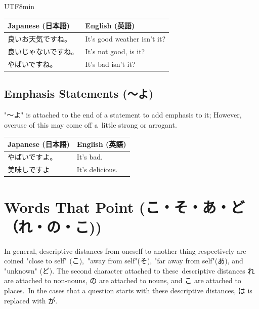 \documentclass[11pt]{article}
\begin{document}
\begin{CJK}{UTF8}{min}
\begin{tabularx}{\textwidth}{X | X}
    \textbf{Japanese (日本語)} & \textbf{English (英語)} \\
    \midrule
    良いお天気ですね。 & It's good weather isn't it? \\
    良いじゃないですね。& It's not good, is it? \\
    やばいですね。 & It's bad isn't it? \\
    \bottomrule
\end{tabularx}

\vspace{25pt}
\subsection{Emphasis Statements (〜よ)}

"〜よ" is attached to the end of a statement to add emphasis to it; However, overuse of this may come off a\
little strong or arrogant.

\begin{tabularx}{\textwidth}{X | X}
    \textbf{Japanese (日本語)} & \textbf{English (英語)} \\
    \midrule
    やばいですよ。 & It's bad. \\
    美味しですよ & It's delicious. \\
    \bottomrule
\end{tabularx}


\newpage
\section{Words That Point (こ・そ・あ・ど（れ・の・こ))}

In general, descriptive distances from oneself to another thing respectively are coined "close to self" (こ),\
"away from self"(そ), "far away from self"(あ), and "unknown" (ど).  The second character attached to these\
descriptive distances れ are attached to non-nouns, の are attached to nouns, and こ are attached to places.\
In the cases that a question starts with these descriptive distances, は is replaced with が.

\vspace{10pt}


\end{CJK}
\end{document}
